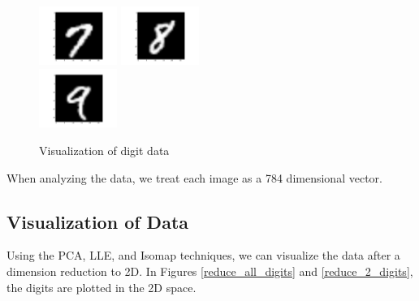 \documentclass[11pt]{article}
\begin{document}
\begin{figure}[H]
\begin{center}
\includegraphics[width=1in]{7.png}
\includegraphics[width=1in]{8.png}\\
\includegraphics[width=1in]{9.png}
\caption{Visualization of digit data}
\label{digit-vis}
\end{center}
\end{figure}
When analyzing the data, we treat each image as a 784 dimensional vector.


\subsection*{Visualization of Data}
Using the PCA, LLE, and Isomap techniques, we can visualize the data after a dimension reduction to 2D. In Figures \ref{reduce_all_digits} and \ref{reduce_2_digits}, the digits are plotted in the 2D space.
\end{document}
